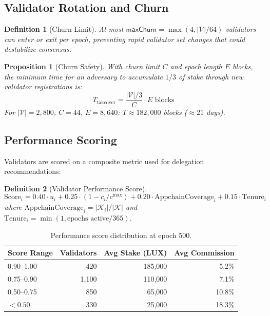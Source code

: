 \documentclass[11pt,a4paper]{article}
\newtheorem{proposition}[theorem]{Proposition}
\newtheorem{definition}{Definition}
\begin{document}
\subsection{Validator Rotation and Churn}

\begin{definition}[Churn Limit]
At most $\mathsf{maxChurn} = \max(4, |\mathcal{V}| / 64)$ validators can enter or exit per epoch, preventing rapid validator set changes that could destabilize consensus.
\end{definition}

\begin{proposition}[Churn Safety]
With churn limit $C$ and epoch length $E$ blocks, the minimum time for an adversary to accumulate $1/3$ of stake through new validator registrations is:
\begin{equation}
    T_{\text{takeover}} = \frac{|\mathcal{V}| / 3}{C} \cdot E \text{ blocks}
\end{equation}
For $|\mathcal{V}| = 2{,}800$, $C = 44$, $E = 8{,}640$: $T \approx 182{,}000$ blocks ($\approx 21$ days).
\end{proposition}

\subsection{Performance Scoring}

Validators are scored on a composite metric used for delegation recommendations:

\begin{definition}[Validator Performance Score]
\begin{equation}
    \text{Score}_i = 0.40 \cdot u_i + 0.25 \cdot (1 - c_i / c^{\max}) + 0.20 \cdot \text{AppchainCoverage}_i + 0.15 \cdot \text{Tenure}_i
\end{equation}
where $\text{AppchainCoverage}_i = |\mathcal{K}_i| / |\mathcal{K}|$ and $\text{Tenure}_i = \min(1, \text{epochs active} / 365)$.
\end{definition}

\begin{table}[H]
\centering
\caption{Performance score distribution at epoch 500.}
\label{tab:scores}
\begin{tabular}{lrrr}
\toprule
\textbf{Score Range} & \textbf{Validators} & \textbf{Avg Stake (LUX)} & \textbf{Avg Commission} \\
\midrule
0.90--1.00 & 420 & 185,000 & 5.2\% \\
0.75--0.90 & 1,100 & 110,000 & 7.1\% \\
0.50--0.75 & 850 & 65,000 & 10.8\% \\
$< 0.50$ & 330 & 25,000 & 18.3\% \\
\bottomrule
\end{tabular}
\end{table}
\end{document}

